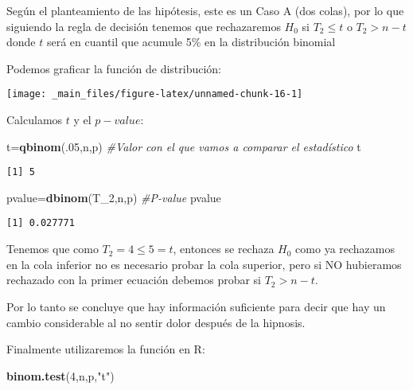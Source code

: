 \documentclass[
  a4paper,
  oneside,
  openany]{book}
\newenvironment{Shaded}{\begin{snugshade}}{\end{snugshade}}
\newcommand{\CommentTok}[1]{\textcolor[rgb]{0.56,0.35,0.01}{\textit{#1}}}
\newcommand{\DecValTok}[1]{\textcolor[rgb]{0.00,0.00,0.81}{#1}}
\newcommand{\KeywordTok}[1]{\textcolor[rgb]{0.13,0.29,0.53}{\textbf{#1}}}
\newcommand{\NormalTok}[1]{#1}
\newcommand{\StringTok}[1]{\textcolor[rgb]{0.31,0.60,0.02}{#1}}
\begin{document}
Según el planteamiento de las hipótesis, este es un Caso A (dos colas), por lo que siguiendo la regla de decisión tenemos que rechazaremos \(H_0\) si \(T_2 \leq t\) o \(T_2>n-t\) donde \(t\) será en cuantil que acumule 5\% en la distribución binomial

Podemos graficar la función de distribución:

\begin{center}\texttt{[image: \_main\_files/figure-latex/unnamed-chunk-16-1]} \end{center}

Calculamos \(t\) y el \(p-value\):

\begin{Shaded}
\begin{Highlighting}[]
\NormalTok{t=}\KeywordTok{qbinom}\NormalTok{(.}\DecValTok{05}\NormalTok{,n,p)       }\CommentTok{\#Valor con el que vamos a comparar el estadístico}
\NormalTok{t}
\end{Highlighting}
\end{Shaded}

\begin{verbatim}
[1] 5
\end{verbatim}

\begin{Shaded}
\begin{Highlighting}[]
\NormalTok{pvalue=}\KeywordTok{dbinom}\NormalTok{(T\_}\DecValTok{2}\NormalTok{,n,p)   }\CommentTok{\#P{-}value}
\NormalTok{pvalue}
\end{Highlighting}
\end{Shaded}

\begin{verbatim}
[1] 0.027771
\end{verbatim}

Tenemos que como \(T_2=4\leq 5 =t\), entonces se rechaza \(H_0\) como ya rechazamos en la cola inferior no es necesario probar la cola superior, pero si NO hubieramos rechazado con la primer ecuación debemos probar si \(T_2>n-t\).

Por lo tanto se concluye que hay información suficiente para decir que hay un cambio considerable al no sentir dolor después de la hipnosis.

Finalmente utilizaremos la función en R:

\begin{Shaded}
\begin{Highlighting}[]
\KeywordTok{binom.test}\NormalTok{(}\DecValTok{4}\NormalTok{,n,p,}\StringTok{"t"}\NormalTok{)}
\end{Highlighting}
\end{Shaded}
\end{document}
